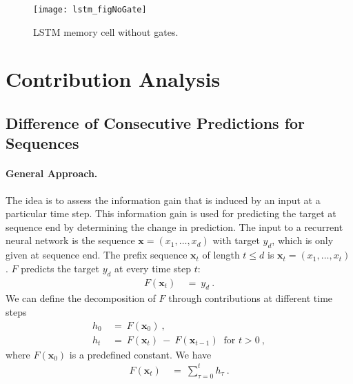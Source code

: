 \documentclass{article}
\newcommand\Bx{\bm{x}}
\renewcommand{\leq}{\leqslant}
\begin{document}
\begin{appendices}
\begin{figure}[htb]
\centering
\texttt{[image: lstm\_figNoGate]}
\caption{LSTM memory cell without gates. 
\label{fig:cellLRPNoGate}}
\end{figure}

\clearpage


\pagebreak

\section{Contribution Analysis}
\label{sec:Aback}

\subsection{Difference of Consecutive Predictions for Sequences}

\paragraph{General Approach.}

The idea is to assess the information gain that is induced by an input at a particular time step. This information gain is used for predicting the target at sequence end
by determining the change in prediction.
The input to a recurrent neural network is the sequence
$\Bx=(x_1,\ldots,x_d)$ with target $y_d$, which is only given at
sequence end.
The prefix sequence $\Bx_t$ of length $t\leq d$ is $\Bx_t=(x_1,\ldots,x_t)$.
$F$ predicts the target $y_d$ at every time step $t$:
\begin{align}
 F(\Bx_t) \ &= \ y_d \ . 
\end{align} 
We can define the decomposition of $F$ through contributions at different time steps
\begin{align}
 h_0 \ &= \ F(\Bx_0)  \ , \\
 h_t \ &= \ F(\Bx_t) \ - \ F(\Bx_{t-1}) \ \text{ for } t > 0 \ ,
\end{align} 
where $F(\Bx_0)$ is a predefined constant.
We have
\begin{align}
 F(\Bx_t) \ &= \ \sum_{\tau=0}^t h_{\tau} \ . 
\end{align} 


\end{appendices}
\end{document}
